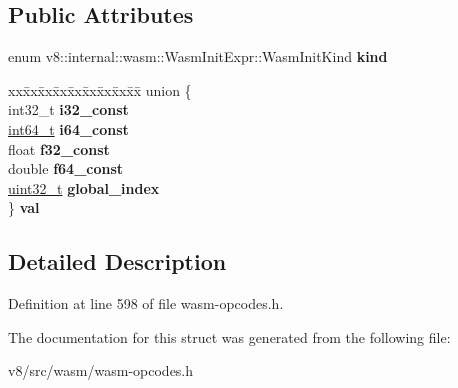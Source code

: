 \subsection*{Public Attributes}
\begin{DoxyCompactItemize}
\item 
\mbox{\label{structv8_1_1internal_1_1wasm_1_1WasmInitExpr_a4a54777aa57900a61e4b5e76e70143de}} 
enum v8\+::internal\+::wasm\+::\+Wasm\+Init\+Expr\+::\+Wasm\+Init\+Kind {\bfseries kind}
\item 
\mbox{\label{structv8_1_1internal_1_1wasm_1_1WasmInitExpr_a891befe0dacffb787dc10bc20710f58f}} 
\begin{tabbing}
xx\=xx\=xx\=xx\=xx\=xx\=xx\=xx\=xx\=\kill
union \{\\
\>int32\_t {\bfseries i32\_const}\\
\>\mbox{\hyperlink{classint64__t}{int64\_t}} {\bfseries i64\_const}\\
\>float {\bfseries f32\_const}\\
\>double {\bfseries f64\_const}\\
\>\mbox{\hyperlink{classuint32__t}{uint32\_t}} {\bfseries global\_index}\\
\} {\bfseries val}\\

\end{tabbing}\end{DoxyCompactItemize}


\subsection{Detailed Description}


Definition at line 598 of file wasm-\/opcodes.\+h.



The documentation for this struct was generated from the following file\+:\begin{DoxyCompactItemize}
\item 
v8/src/wasm/wasm-\/opcodes.\+h\end{DoxyCompactItemize}
